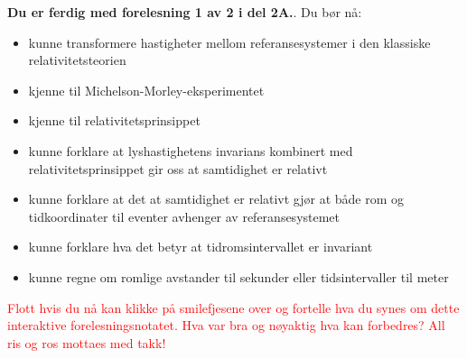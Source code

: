 \documentclass{beamer}
\let\hrefori\href
\renewcommand{\href}[2]{{\setlength{\fboxsep}{1pt}\colorbox{sunset}{\hrefori{#1}{#2}}}}
\newcommand{\pagebutton}[1]{\setbeamertemplate{button}{\tikz\node[inner xsep = 5pt, draw = structure!90, fill = green(ryb), rounded corners = 8pt]{\color{amber}\Large\insertbuttontext};}\beamerbutton{#1}}
\begin{document}
\begin{frame}
\label{oppsummering}
\hyperlink{tog27}{\pagebutton{\small Forrige side}}\href{https://nettskjema.no/a/170171}{ \Changey[1][yellow]{-2}}
{\bf Du er ferdig med forelesning 1 av 2 i del 2A.}. Du bør nå:
\begin{itemize}
\item kunne transformere hastigheter mellom referansesystemer i den klassiske relativitetsteorien
\item kjenne til Michelson-Morley-eksperimentet
\item kjenne til relativitetsprinsippet
\item kunne forklare at lyshastighetens invarians kombinert med relativitetsprinsippet gir oss at samtidighet er relativt
\item kunne forklare at det at samtidighet er relativt gjør at både rom og tidkoordinater til eventer avhenger av referansesystemet
\item kunne forklare hva det betyr at tidromsintervallet er invariant
\item kunne regne om romlige avstander til sekunder eller tidsintervaller til meter
\end{itemize}
\textcolor{red}{Flott hvis du nå kan klikke på smilefjesene over og fortelle hva du synes om dette interaktive forelesningsnotatet. Hva var bra og nøyaktig hva kan forbedres? All ris og ros mottaes med takk!}
\end{frame}
\end{document}
